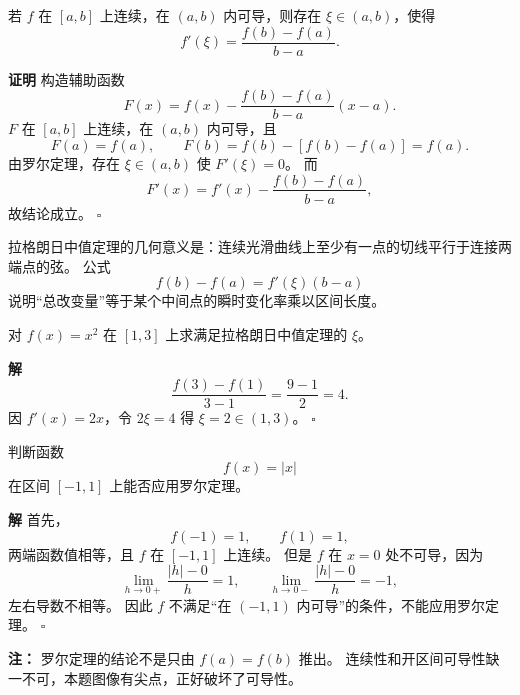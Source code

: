 \documentclass[fontset=fandol]{ctexart}
\newenvironment{proofdetail}{\par\noindent\textbf{证明}\quad}{\hfill$\square$\par\vspace{0.8em}}
\newenvironment{solution}{\par\noindent\textbf{解}\quad}{\hfill$\square$\par\vspace{0.8em}}
\newenvironment{warning}{\par\noindent\textbf{注：}\quad}{\par\vspace{0.8em}}
\begin{document}
\begin{theorem}[拉格朗日中值定理]
若 $f$ 在 $[a,b]$ 上连续，在 $(a,b)$ 内可导，则存在 $\xi\in(a,b)$，使得
\[
f'(\xi)=\frac{f(b)-f(a)}{b-a}.
\]
\end{theorem}
\begin{proofdetail}
构造辅助函数
\[
F(x)=f(x)-\frac{f(b)-f(a)}{b-a}(x-a).
\]
$F$ 在 $[a,b]$ 上连续，在 $(a,b)$ 内可导，且
\[
F(a)=f(a),\qquad F(b)=f(b)-[f(b)-f(a)]=f(a).
\]
由罗尔定理，存在 $\xi\in(a,b)$ 使 $F'(\xi)=0$。 而
\[
F'(x)=f'(x)-\frac{f(b)-f(a)}{b-a},
\]
故结论成立。
\end{proofdetail}

拉格朗日中值定理的几何意义是：连续光滑曲线上至少有一点的切线平行于连接两端点的弦。 公式
\[
f(b)-f(a)=f'(\xi)(b-a)
\]
说明“总改变量”等于某个中间点的瞬时变化率乘以区间长度。

\begin{center}
\end{center}

\begin{example}[验证中值定理]
对 $f(x)=x^2$ 在 $[1,3]$ 上求满足拉格朗日中值定理的 $\xi$。
\end{example}
\begin{solution}
\[
\frac{f(3)-f(1)}{3-1}=\frac{9-1}{2}=4.
\]
因 $f'(x)=2x$，令 $2\xi=4$ 得 $\xi=2\in(1,3)$。
\end{solution}

\begin{example}[罗尔定理的条件核查]
判断函数
\[
f(x)=|x|
\]
在区间 $[-1,1]$ 上能否应用罗尔定理。
\end{example}
\begin{solution}
首先，
\[
f(-1)=1,\qquad f(1)=1,
\]
两端函数值相等，且 $f$ 在 $[-1,1]$ 上连续。 但是 $f$ 在 $x=0$ 处不可导，因为
\[
\lim_{h\to0+}\frac{|h|-0}{h}=1,\qquad
\lim_{h\to0-}\frac{|h|-0}{h}=-1,
\]
左右导数不相等。 因此 $f$ 不满足“在 $(-1,1)$ 内可导”的条件，不能应用罗尔定理。
\end{solution}
\begin{warning}
罗尔定理的结论不是只由 $f(a)=f(b)$ 推出。 连续性和开区间可导性缺一不可，本题图像有尖点，正好破坏了可导性。
\end{warning}
\end{document}
